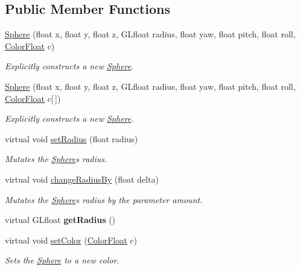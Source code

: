 \subsection*{Public Member Functions}
\begin{DoxyCompactItemize}
\item 
\hyperlink{classtsgl_1_1_sphere_a80d326f71e37a88274d479c87ad96efe}{Sphere} (float x, float y, float z, G\+Lfloat radius, float yaw, float pitch, float roll, \hyperlink{structtsgl_1_1_color_float}{Color\+Float} c)
\begin{DoxyCompactList}\small\item\em Explicitly constructs a new \hyperlink{classtsgl_1_1_sphere}{Sphere}. \end{DoxyCompactList}\item 
\hyperlink{classtsgl_1_1_sphere_adcf41c60e73de7447b9720272c0200aa}{Sphere} (float x, float y, float z, G\+Lfloat radius, float yaw, float pitch, float roll, \hyperlink{structtsgl_1_1_color_float}{Color\+Float} c\mbox{[}$\,$\mbox{]})
\begin{DoxyCompactList}\small\item\em Explicitly constructs a new \hyperlink{classtsgl_1_1_sphere}{Sphere}. \end{DoxyCompactList}\item 
virtual void \hyperlink{classtsgl_1_1_sphere_a7d1f92b4c10a165b909cb6edb12288d5}{set\+Radius} (float radius)
\begin{DoxyCompactList}\small\item\em Mutates the \hyperlink{classtsgl_1_1_sphere}{Sphere}\textquotesingle{}s radius. \end{DoxyCompactList}\item 
virtual void \hyperlink{classtsgl_1_1_sphere_afeddb373be43550a1e3386d53332dd6f}{change\+Radius\+By} (float delta)
\begin{DoxyCompactList}\small\item\em Mutates the \hyperlink{classtsgl_1_1_sphere}{Sphere}\textquotesingle{}s radius by the parameter amount. \end{DoxyCompactList}\item 
\mbox{\label{classtsgl_1_1_sphere_a465494e673964c2fde85ed9b342a665d}} 
virtual G\+Lfloat {\bfseries get\+Radius} ()
\item 
virtual void \hyperlink{classtsgl_1_1_sphere_aa0870a70e34c6c77e2d61e50dbf3cc07}{set\+Color} (\hyperlink{structtsgl_1_1_color_float}{Color\+Float} c)
\begin{DoxyCompactList}\small\item\em Sets the \hyperlink{classtsgl_1_1_sphere}{Sphere} to a new color. \end{DoxyCompactList}\item 

\end{DoxyCompactItemize}
